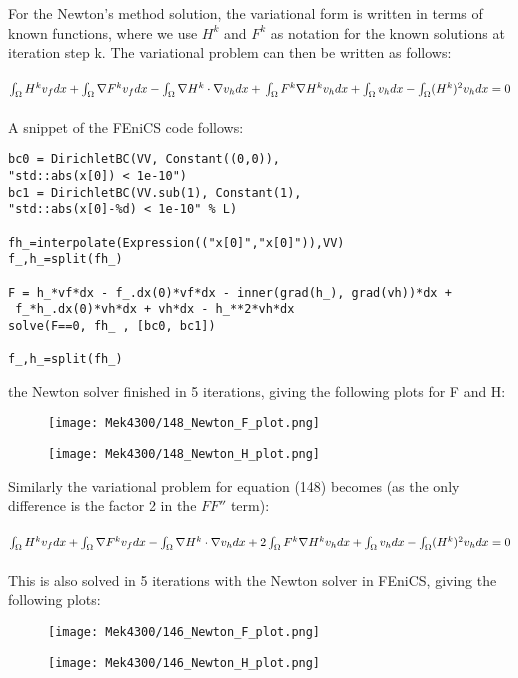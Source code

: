 \documentclass[a4paper,english,11pt,twoside]{article}
\begin{document}
\newpage
For the Newton's method solution, the variational form is written in terms of known functions, where we use $H^k$ and $F^k$ as notation for the known solutions at iteration step k. The variational problem can then be written as follows:\\
\\
$\int_{\Omega}H^kv_fdx + \int_{\Omega}\nabla F^k v_fdx - \int_{\Omega}\nabla H^k\cdot\nabla v_hdx + \\
\\
\int_{\Omega} F^k \nabla H^k v_hdx + \int_{\Omega}v_hdx - \int_{\Omega}(H^k)^2v_hdx = 0$\\
\\
A snippet of the FEniCS code follows:
\begin{lstlisting}[style=python]
bc0 = DirichletBC(VV, Constant((0,0)), 
"std::abs(x[0]) < 1e-10")
bc1 = DirichletBC(VV.sub(1), Constant(1), 
"std::abs(x[0]-%d) < 1e-10" % L)

fh_=interpolate(Expression(("x[0]","x[0]")),VV)
f_,h_=split(fh_)

F = h_*vf*dx - f_.dx(0)*vf*dx - inner(grad(h_), grad(vh))*dx +
 f_*h_.dx(0)*vh*dx + vh*dx - h_**2*vh*dx
solve(F==0, fh_ , [bc0, bc1])

f_,h_=split(fh_)
\end{lstlisting}
\newpage
 the Newton solver finished in 5 iterations, giving the following plots for F and H:\\
\begin{figure}[h!]
\texttt{[image: Mek4300/148\_Newton\_F\_plot.png]}
\end{figure}
\begin{figure}[h!]
\texttt{[image: Mek4300/148\_Newton\_H\_plot.png]}
\end{figure}
\newpage
Similarly the variational problem for equation (148) becomes (as the only difference is the factor 2 in the $FF''$ term):\\
\\
$\int_{\Omega}H^kv_fdx + \int_{\Omega}\nabla F^k v_fdx - \int_{\Omega}\nabla H^k\cdot\nabla v_hdx + \\
\\
2\int_{\Omega} F^k \nabla H^k v_hdx + \int_{\Omega}v_hdx - \int_{\Omega}(H^k)^2v_hdx = 0$\\
\\
This is also solved in 5 iterations with the Newton solver in FEniCS, giving the following plots:\\
\begin{figure}[h!]
\texttt{[image: Mek4300/146\_Newton\_F\_plot.png]}
\end{figure}
\begin{figure}[h!]
\texttt{[image: Mek4300/146\_Newton\_H\_plot.png]}
\end{figure}
\end{document}
